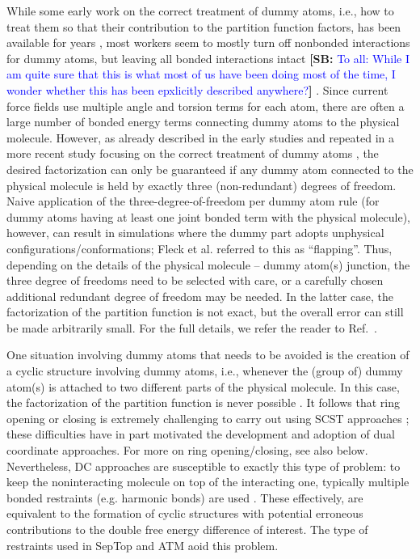 \documentclass[9pt,bestpractices,pubversion]{livecoms}
\newcommand{\sbnote}[1]{%
  {\bfseries{}[SB: }%
  {\textcolor{blue}{#1}}{\bfseries{}]}
  }
\begin{document}
While some early work on the correct treatment of dummy atoms, i.e., how to treat them so that their contribution to the partition function factors, has been available for years \cite{Boresch_2002,Shobana_2000,Wang_2012}, most workers seem to mostly turn off nonbonded interactions for dummy atoms, but leaving all bonded interactions intact \sbnote{To all: While I am quite sure that this is what most of us have been doing most of the time, I wonder whether this has been epxlicitly described anywhere?}. Since current force fields use multiple angle and torsion terms for each atom, there are often a large number of bonded energy terms connecting dummy atoms to the physical molecule. However, as already described in the early studies and repeated in a more recent study focusing on the correct treatment of dummy atoms \cite{Fleck_2021}, the desired factorization can only be guaranteed if any dummy atom connected to the physical molecule is held by exactly three (non-redundant) degrees of freedom. Naive application of the three-degree-of-freedom per dummy atom rule (for dummy atoms having at least one joint bonded term with the physical molecule), however, can result in simulations where the dummy part adopts unphysical configurations/conformations; Fleck et al. referred to this as “flapping”. Thus, depending on the details of the physical molecule -- dummy atom(s) junction, the three degree of freedoms need to be selected with care, or a carefully chosen additional redundant degree of freedom may be needed. In the latter case, the factorization of the partition function is not exact, but the overall error can still be made arbitrarily small. For the full details, we refer the reader to Ref.~\cite{Fleck_2021}. 

One situation involving dummy atoms that needs to be avoided is the creation of a cyclic structure involving dummy atoms, i.e., whenever the (group of) dummy atom(s) is attached to two different parts of the physical molecule. In this case, the factorization of the partition function is never possible \cite{Shobana_2000}. It follows that ring opening or closing is extremely challenging to carry out using SCST approaches \cite{liu2015ring}; these difficulties have in part motivated the development and adoption of dual coordinate approaches. For more on ring opening/closing, see also below. Nevertheless, DC approaches are susceptible to exactly this type of problem: to keep the noninteracting molecule on top of the interacting one, typically multiple bonded restraints (e.g. harmonic bonds) are used \cite{Axelsen_1998,Ries_2022}. These effectively, are equivalent to the formation of cyclic structures with potential erroneous contributions to the double free energy difference of interest. The type of restraints used in SepTop \cite{rocklin2013separated,Baumann_2023} and ATM \cite{Azimi_2022} aoid this problem.
\end{document}
